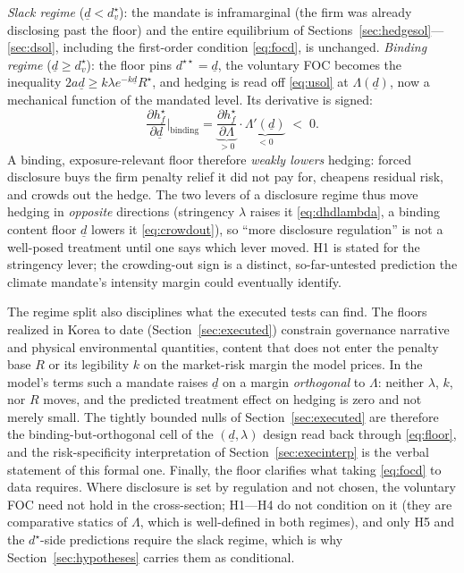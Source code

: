 \documentclass[11pt,a4paper]{article}
\begin{document}
\emph{Slack regime} ($\underline{d}<d^\star_v$): the mandate is inframarginal (the firm was already disclosing past the floor) and the entire equilibrium of Sections~\ref{sec:hedgesol}---\ref{sec:dsol}, including the first-order condition \eqref{eq:focd}, is unchanged. \emph{Binding regime} ($\underline{d}\ge d^\star_v$): the floor pins $d^{\star\star}=\underline{d}$, the voluntary FOC becomes the inequality $2a\underline{d}\ge k\lambda e^{-k\underline{d}}R^\star$, and hedging is read off \eqref{eq:usol} at $\Lambda(\underline{d})$, now a mechanical function of the mandated level. Its derivative is signed:
\begin{equation}
\frac{\partial h_f^{\star}}{\partial \underline{d}}\Big|_{\text{binding}}
=\underbrace{\frac{\partial h_f^\star}{\partial\Lambda}}_{>0}\cdot\underbrace{\Lambda'(\underline{d})}_{<0}\;<\;0.
\label{eq:crowdout}
\end{equation}
A binding, exposure-relevant floor therefore \emph{weakly lowers} hedging: forced disclosure buys the firm penalty relief it did not pay for, cheapens residual risk, and crowds out the hedge. The two levers of a disclosure regime thus move hedging in \emph{opposite} directions (stringency $\lambda$ raises it \eqref{eq:dhdlambda}, a binding content floor $\underline{d}$ lowers it \eqref{eq:crowdout}), so ``more disclosure regulation'' is not a well-posed treatment until one says which lever moved. H1 is stated for the stringency lever; the crowding-out sign is a distinct, so-far-untested prediction the climate mandate's intensity margin could eventually identify.

The regime split also disciplines what the executed tests can find. The floors realized in Korea to date (Section~\ref{sec:executed}) constrain governance narrative and physical environmental quantities, content that does not enter the penalty base $R$ or its legibility $k$ on the market-risk margin the model prices. In the model's terms such a mandate raises $\underline{d}$ on a margin \emph{orthogonal} to $\Lambda$: neither $\lambda$, $k$, nor $R$ moves, and the predicted treatment effect on hedging is zero and not merely small. The tightly bounded nulls of Section~\ref{sec:executed} are therefore the binding-but-orthogonal cell of the $(\underline{d},\lambda)$ design read back through \eqref{eq:floor}, and the risk-specificity interpretation of Section~\ref{sec:execinterp} is the verbal statement of this formal one. Finally, the floor clarifies what taking \eqref{eq:focd} to data requires. Where disclosure is set by regulation and not chosen, the voluntary FOC need not hold in the cross-section; H1---H4 do not condition on it (they are comparative statics of $\Lambda$, which is well-defined in both regimes), and only H5 and the $d^\star$-side predictions require the slack regime, which is why Section~\ref{sec:hypotheses} carries them as conditional.
\end{document}

